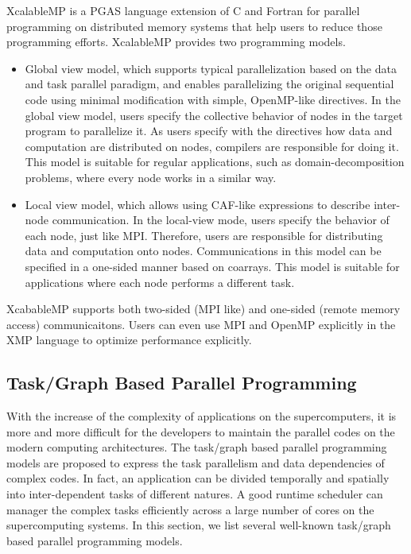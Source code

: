 XcalableMP \cite{lee2010implementation} is a PGAS language extension of C and Fortran for parallel programming on distributed memory systems that help users to reduce those programming efforts. XcalableMP provides two programming models. 
\begin{itemize}
	\item Global view model, which supports typical parallelization based on the data and task parallel paradigm, and enables parallelizing the original sequential code using minimal modification with simple, OpenMP-like directives. In the global view model, users specify the collective behavior of nodes in the target program to parallelize it. As users specify with the directives how data and computation are distributed on nodes, compilers are responsible for doing it. This model is suitable for regular applications, such as domain-decomposition problems, where every node works in a similar way.
	
	\item Local view model, which allows using CAF-like expressions to describe inter-node communication. In the local-view mode, users specify the behavior of each node, just like MPI. Therefore, users are responsible for distributing data and computation onto nodes. Communications in this model can be specified in a one-sided manner based on coarrays. This model is suitable for applications where each node performs a different task.
\end{itemize}

XcabableMP supports both two-sided (MPI like) and one-sided (remote memory access) communicaitons. Users can even use MPI and OpenMP explicitly in the XMP language to optimize performance explicitly.

\subsection{Task/Graph Based Parallel Programming}

With the increase of the complexity of applications on the supercomputers, it is more and more difficult for the developers to maintain the parallel codes on the modern computing architectures. The task/graph based parallel programming models are proposed to express the task parallelism and data dependencies of complex codes. In fact, an application can be divided temporally and spatially into inter-dependent tasks of different natures. A good runtime scheduler can manager the complex tasks efficiently across a large number of cores on the supercomputing systems. In this section, we list several well-known task/graph based parallel programming models.

